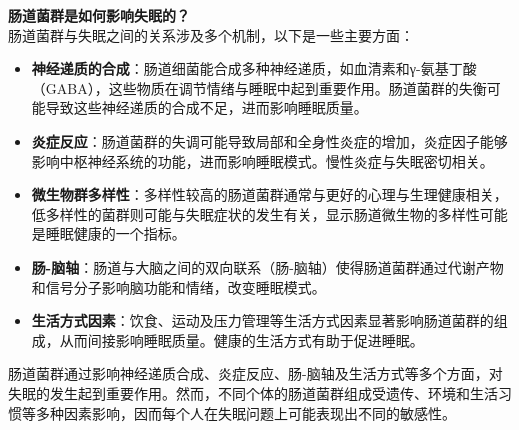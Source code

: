 \documentclass[UTF8]{ctexart}
\begin{document}
\begin{tcolorbox}[
    enhanced,
    colback=lightpurple!10, %
    colframe=lightpurple!10,  %
    arc=3mm,
    boxrule=0.5pt,
    width=\textwidth,
    top=8pt,
    bottom=8pt
]
{\small{\color{lightpurple}\faQuestionCircle}\quad \textbf{肠道菌群是如何影响失眠的？}\\
{\color{orange!50}\faComments}\quad 肠道菌群与失眠之间的关系涉及多个机制，以下是一些主要方面：
\begin{itemize}
    \item \textbf{神经递质的合成}：肠道细菌能合成多种神经递质，如血清素和γ-氨基丁酸（GABA），这些物质在调节情绪与睡眠中起到重要作用。肠道菌群的失衡可能导致这些神经递质的合成不足，进而影响睡眠质量。
    \item \textbf{炎症反应}：肠道菌群的失调可能导致局部和全身性炎症的增加，炎症因子能够影响中枢神经系统的功能，进而影响睡眠模式。慢性炎症与失眠密切相关。
    \item \textbf{微生物群多样性}：多样性较高的肠道菌群通常与更好的心理与生理健康相关，低多样性的菌群则可能与失眠症状的发生有关，显示肠道微生物的多样性可能是睡眠健康的一个指标。
    \item \textbf{肠-脑轴}：肠道与大脑之间的双向联系（肠-脑轴）使得肠道菌群通过代谢产物和信号分子影响脑功能和情绪，改变睡眠模式。
    \item \textbf{生活方式因素}：饮食、运动及压力管理等生活方式因素显著影响肠道菌群的组成，从而间接影响睡眠质量。健康的生活方式有助于促进睡眠。
\end{itemize}
肠道菌群通过影响神经递质合成、炎症反应、肠-脑轴及生活方式等多个方面，对失眠的发生起到重要作用。然而，不同个体的肠道菌群组成受遗传、环境和生活习惯等多种因素影响，因而每个人在失眠问题上可能表现出不同的敏感性。
}
\end{tcolorbox}
\vspace{-0.7cm}
\end{document}

